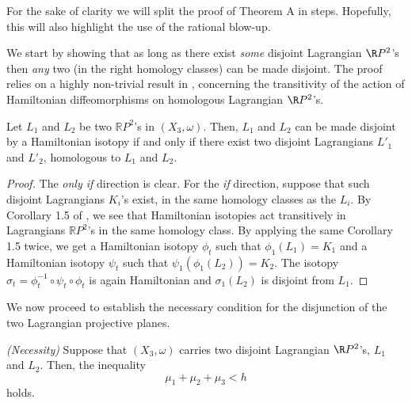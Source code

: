 For the sake of clarity we will split the proof of Theorem A in steps. Hopefully, this will also highlight the use of the rational blow-up.

We start by showing that as long as there exist \textit{some} disjoint Lagrangian $\R P^2$'s then \textit{any} two (in the right homology classes) can be made disjoint. The proof relies on a highly non-trivial result in \cite{LLWuniq}, concerning the transitivity of the action of Hamiltonian diffeomorphisms on homologous Lagrangian $\R P^2$'s. 



\begin{lemma}\label{extoham}
Let $L_1$ and $L_2$ be two $\mathbb{R}P^2$'s in $(X_3,\omega)$. Then, $L_1$ and $L_2$ can be made disjoint by a Hamiltonian isotopy if and only if there exist two disjoint Lagrangians $L'_1$ and $L'_2$, homologous to $L_1$ and $L_2$.
\end{lemma} 

\begin{proof}
The \textit{only if} direction is clear. For the \textit{if} direction, suppose that such disjoint Lagrangians $K_i$'s exist, in the same homology classes as the $L_i$. By Corollary 1.5 of \cite{LLWuniq}, we see that Hamiltonian isotopies act transitively in Lagrangians $\mathbb{R}P^2$'s in the same homology class. By applying the same Corollary 1.5 twice, we get a Hamiltonian isotopy $\phi_t$ such that $\phi_1(L_1)=K_1$ and a Hamiltonian isotopy $\psi_t$ such that $\psi_1(\phi_1(L_2))=K_2$. The isotopy $\sigma_t=\phi_t^{-1}\circ \psi_t\circ \phi_t$ is again Hamiltonian and $\sigma_1(L_2)$ is disjoint from $L_1$.
\end{proof}

We now proceed to establish the necessary condition for the disjunction of the two Lagrangian projective planes. 

\begin{proposition}\emph{(Necessity)}\label{2rpnec}
Suppose that $(X_3,\omega)$ carries two disjoint Lagrangian $\R P^2$'s, $L_1$ and $L_2$. Then, the inequality
\[\mu_1+\mu_2+\mu_3<h\]
holds.
\end{proposition}

